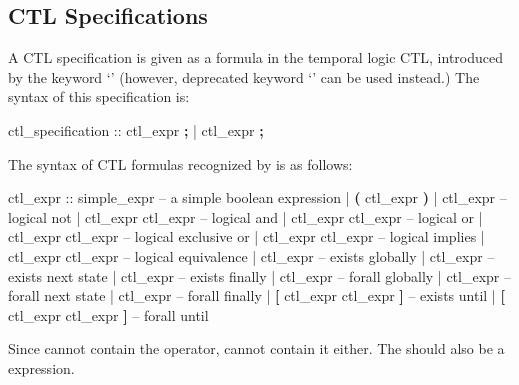 \subsection{CTL Specifications}
\label{CTL Specifications}
%
A CTL specification is given as a formula in the temporal logic CTL,
introduced by the keyword `' (however, deprecated
keyword `' can be used instead.)
%
The syntax of this specification is:
%
\begin{Grammar}
ctl_specification ::  ctl_expr \textbf{;}
                   |  ctl_expr \textbf{;}
\end{Grammar}
%
The syntax of CTL formulas recognized by \nusmv is as follows:
%
\begin{Grammar}
ctl_expr ::
    simple_expr                 -- a simple boolean expression
    | \textbf{(} ctl_expr \textbf{)}
    | \operator{!} ctl_expr                -- logical not
    | ctl_expr \operator{\&} ctl_expr       -- logical and
    | ctl_expr \operator{|} ctl_expr       -- logical or
    | ctl_expr  ctl_expr     -- logical exclusive or
    | ctl_expr \operator{->} ctl_expr      -- logical implies
    | ctl_expr \operator{<->} ctl_expr     -- logical equivalence
    |  ctl_expr               -- exists globally
    |  ctl_expr               -- exists next state
    |  ctl_expr               -- exists finally
    |  ctl_expr               -- forall globally
    |  ctl_expr               -- forall next state
    |  ctl_expr               -- forall finally
    |  \textbf{[} ctl_expr  ctl_expr \textbf{]} -- exists until
    |  \textbf{[} ctl_expr  ctl_expr \textbf{]} -- forall until
\end{Grammar}
%
Since  cannot contain the 
operator,  cannot contain it either.
%
The  should also be a \Boolean expression.

